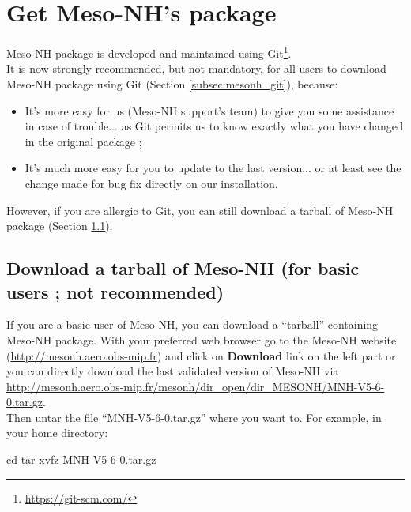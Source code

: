 \section{Get Meso-NH's package}
\label{sec:get_mesonh_package}

Meso-NH package is developed and maintained using Git\footnote{\href{https://git-scm.com/}{https://git-scm.com/}}. \\

It is now strongly recommended, but not mandatory, for all users to download Meso-NH package using Git (Section \ref{subsec:mesonh_git}), because:
\begin{itemize}
\item It's more easy for us (Meso-NH support's team) to give you some assistance in case of trouble... as Git permits us to know exactly what you have changed in the original package ;
\item It's much more easy for you to update to the last version...  or at least see the change made for bug fix directly on our installation.
\end{itemize}

However, if you are allergic to Git, you can still download a tarball of Meso-NH package (Section \ref{subsec:mesonh_tar}).

\subsection{Download a tarball of Meso-NH (for basic users ; not recommended)}
\label{subsec:mesonh_tar}

If you are a basic user of Meso-NH, you can download a ``tarball'' containing Meso-NH package. With your preferred web browser go to the Meso-NH website (\href{http://mesonh.aero.obs-mip.fr/mesonh}{http://mesonh.aero.obs-mip.fr}) and click on \textbf{Download} link on the left part or you can directly download the last validated version of Meso-NH via \href{http://mesonh.aero.obs-mip.fr/mesonh/dir_open/dir_MESONH/MNH-V5-6-0.tar.gz}{http://mesonh.aero.obs-mip.fr/mesonh/dir\_open/dir\_MESONH/MNH-V5-6-0.tar.gz}. \\

Then untar the file ``MNH-V5-6-0.tar.gz'' where you want to.
For example, in your home directory:
\begin{bashcode}
cd
tar xvfz MNH-V5-6-0.tar.gz
\end{bashcode}

